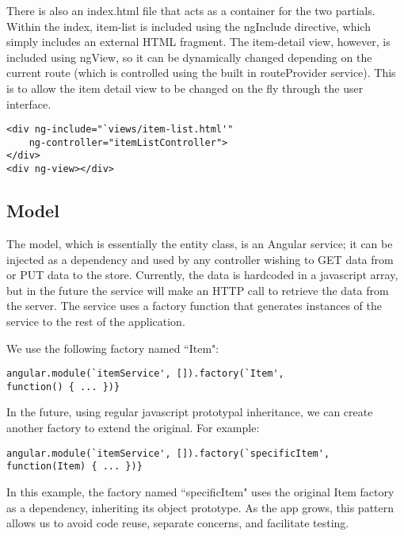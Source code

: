 \documentclass[letterpaper, 12pt]{article}
\begin{document}
\noindent There is also an index.html file that acts as a container for the two partials. Within the index, item-list is included using the ngInclude directive, which simply includes an external HTML fragment. The item-detail view, however, is included using ngView, so it can be dynamically changed depending on the current route (which is controlled using the built in routeProvider service). This is to allow the item detail view to be changed on the fly through the user interface.

\vspace{2mm}
\vspace{-3mm}\begin{verbatim}
<div ng-include="`views/item-list.html'"
    ng-controller="itemListController">
</div>
<div ng-view></div>
\end{verbatim}

\subsection{Model}
\noindent The model, which is essentially the entity class, is an Angular service; it can be injected as a dependency and used by any controller wishing to GET data from or PUT data to the store. Currently, the data is hardcoded in a javascript array, but in the future the service will make an HTTP call to retrieve the data from the server. The service uses a factory function that generates instances of the service to the rest of the application.

\noindent We use the following factory named ``Item":

\vspace{2mm}
\vspace{-3mm}\begin{verbatim}
angular.module(`itemService', []).factory(`Item',
function() { ... })}
\end{verbatim}

\noindent In the future, using regular javascript prototypal inheritance, we can create another factory to extend the original. For example:

\vspace{-3mm}\begin{verbatim}
angular.module(`itemService', []).factory(`specificItem',
function(Item) { ... })}
\end{verbatim}


\noindent In this example, the factory named ``specificItem" uses the original Item factory as a dependency, inheriting its object prototype. As the app grows, this pattern allows us to avoid code reuse, separate concerns, and facilitate testing.
\end{document}
